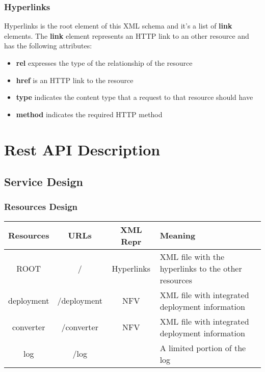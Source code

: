 \documentclass[a4paper,11pt]{article}
\begin{document}
\subsubsection*{Hyperlinks}
Hyperlinks is the root element of this XML schema and it's a list of \textbf{link} elements. The \textbf{link} element represents an HTTP link to an other resource and has the following attributes:
\begin{itemize}
    \item \textbf{rel} expresses the type of the relationship of the resource
    \item \textbf{href} is an HTTP link to the resource
    \item \textbf{type} indicates the content type that a request to that resource should have
    \item \textbf{method} indicates the required HTTP method
\end{itemize}
\newpage
\section{Rest API Description}
\subsection{Service Design}
\subsubsection*{Resources Design}
\begin{center}
    \begin{tabular}{ | c | c | c | p{5cm} |}
    \hline
    Resources & URLs & XML Repr & Meaning \\ \hline \hline
    ROOT & / & Hyperlinks & XML file with the hyperlinks to the other resources \\ \hline
    deployment & /deployment & NFV & XML file with integrated deployment information \\ \hline
    converter & /converter & NFV & XML file with integrated deployment information \\ \hline
    log & /log &  & A limited portion of the log \\ \hline
    \end{tabular}
\end{center}
\end{document}
